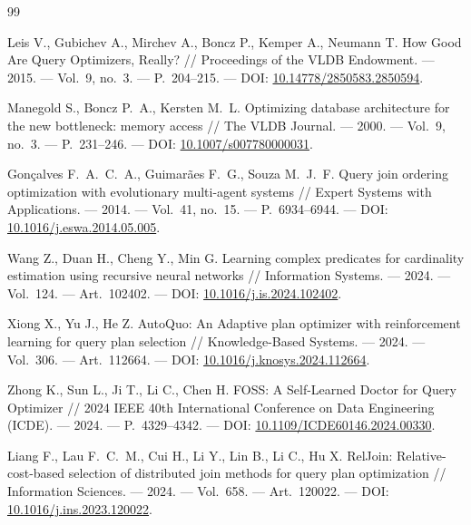 \documentclass[a4paper, final]{article}
\begin{document}
	\providecommand{\refname}{}
	\renewcommand{\refname}{Список использованных источников}
	\providecommand{\bibname}{}
	\renewcommand{\bibname}{Список использованных источников}
	\newpage
	\begin{thebibliography}{99}
		
		Leis V., Gubichev A., Mirchev A., Boncz P., Kemper A., Neumann T.
		How Good Are Query Optimizers, Really? //
		Proceedings of the VLDB Endowment. ---
		2015. --- Vol.~9, no.~3. --- P.~204--215. ---
		DOI: \href{https://doi.org/10.14778/2850583.2850594}{10.14778/2850583.2850594}.
		
		Manegold S., Boncz P.~A., Kersten M.~L.
		Optimizing database architecture for the new bottleneck: memory access //
		The VLDB Journal. ---
		2000. --- Vol.~9, no.~3. --- P.~231--246. ---
		DOI: \href{https://doi.org/10.1007/s007780000031}{10.1007/s007780000031}.
		
		Gonçalves F.~A.~C.~A., Guimarães F.~G., Souza M.~J.~F.
		Query join ordering optimization with evolutionary multi-agent systems //
		Expert Systems with Applications. ---
		2014. --- Vol.~41, no.~15. --- P.~6934--6944. ---
		DOI: \href{https://doi.org/10.1016/j.eswa.2014.05.005}{10.1016/j.eswa.2014.05.005}.
		
		Wang Z., Duan H., Cheng Y., Min G.
		Learning complex predicates for cardinality estimation
		using recursive neural networks //
		Information Systems. ---
		2024. --- Vol.~124. --- Art.~102402. ---
		DOI: \href{https://doi.org/10.1016/j.is.2024.102402}{10.1016/j.is.2024.102402}.
		
		Xiong X., Yu J., He Z.
		AutoQuo: An Adaptive plan optimizer with reinforcement learning for query plan selection //
		Knowledge-Based Systems. ---
		2024. --- Vol.~306. --- Art.~112664. ---
		DOI: \href{https://doi.org/10.1016/j.knosys.2024.112664}{10.1016/j.knosys.2024.112664}.
		
		Zhong K., Sun L., Ji T., Li C., Chen H.
		FOSS: A Self-Learned Doctor for Query Optimizer //
		2024 IEEE 40th International Conference on Data Engineering (ICDE). ---
		2024. --- P.~4329--4342. ---
		DOI: \href{https://doi.org/10.1109/ICDE60146.2024.00330}{10.1109/ICDE60146.2024.00330}.
		
		Liang F., Lau F.~C.~M., Cui H., Li Y., Lin B., Li C., Hu X.
		RelJoin: Relative-cost-based selection of distributed join methods
		for query plan optimization //
		Information Sciences. ---
		2024. --- Vol.~658. --- Art.~120022. ---
		DOI: \href{https://doi.org/10.1016/j.ins.2023.120022}{10.1016/j.ins.2023.120022}.
		

\end{thebibliography}
\end{document}
